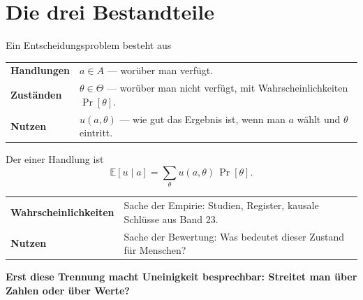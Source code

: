 \section{Die drei Bestandteile}

\begin{definition}
Ein Entscheidungsproblem besteht aus
\begin{center}
{\small
\renewcommand{\arraystretch}{1.55}
\begin{tabular}{@{}P{2.4cm}P{6.2cm}@{}}
\toprule
\textbf{Handlungen} & $a \in A$ --- worüber man verfügt.\\
\textbf{Zuständen} & $\theta \in \Theta$ --- worüber man nicht verfügt, mit Wahrscheinlichkeiten $\Pr[\theta]$.\\
\textbf{Nutzen} & $u(a,\theta)$ --- wie gut das Ergebnis ist, wenn man $a$ wählt und $\theta$ eintritt.\\
\bottomrule
\end{tabular}}
\end{center}
Der  einer Handlung ist
\[ \mathbb{E}[u \mid a] = \sum_\theta u(a,\theta)\,\Pr[\theta] . \]
\end{definition}

\begin{merksatz}
\begin{center}
{\small
\renewcommand{\arraystretch}{1.52}
\begin{tabular}{@{}P{3.4cm}P{5.2cm}@{}}
\toprule
\textbf{Wahrschein\-lichkeiten} & Sache der Empirie: Studien, Register, kausale Schlüsse aus Band 23.\\
\textbf{Nutzen} & Sache der Bewertung: Was bedeutet dieser Zustand für  Menschen?\\
\bottomrule
\end{tabular}}
\end{center}

\begin{center}
\begin{minipage}{0.9\textwidth}
\textbf{Erst diese Trennung macht Uneinigkeit besprechbar: Streitet man über Zahlen oder über Werte?}
\end{minipage}
\end{center}

\begin{center}
\begin{minipage}{0.88\textwidth}
\end{minipage}
\end{center}
\end{merksatz}

